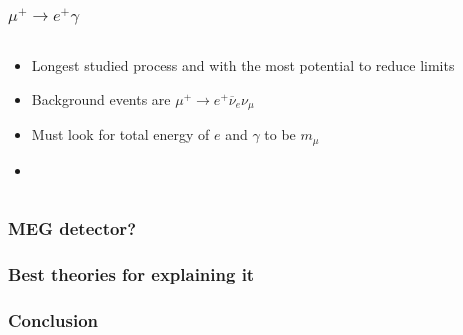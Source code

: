 \documentclass[11pt]{beamer}
\begin{document}
\begin{frame}
    \frametitle{$\mu^+ \rightarrow e^+ \gamma$}
    \begin{columns}[c]
        \begin{column}{0.6\textwidth}
            \begin{itemize}
                \item Longest studied process and with the most potential to reduce limits
                \item Background events are $\mu^+ \rightarrow e^+ \overline{\nu}_e \nu_\mu$ 
                \item Must look for total energy of $e$ and $\gamma$ to be $m_\mu$
                \item 
            \end{itemize}
        \end{column}

        \begin{column}{0.4\textwidth}
            
        \end{column}
    \end{columns}
    

\end{frame}

\begin{frame}
    \frametitle{MEG detector?}

    

\end{frame}

\begin{frame}
    \frametitle{Best theories for explaining it}

    

\end{frame}

\begin{frame}
    \frametitle{Conclusion}

    

\end{frame}
\end{document}

